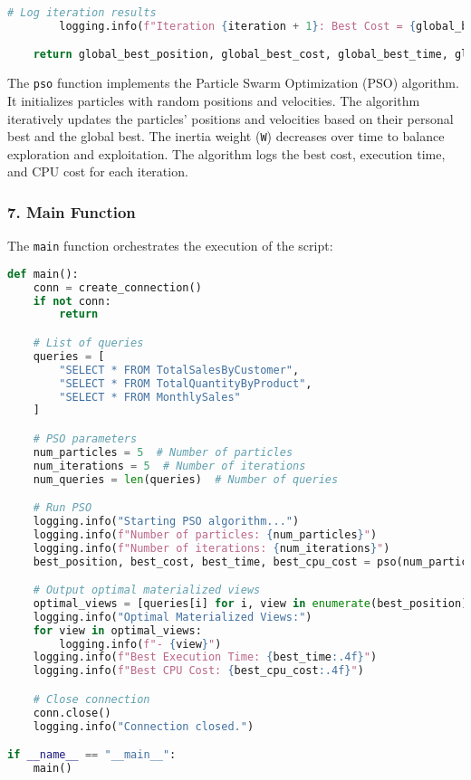 \begin{lstlisting}[language=Python]
        # Log iteration results
        logging.info(f"Iteration {iteration + 1}: Best Cost = {global_best_cost:.4f}, Execution Time = {global_best_time:.4f}, CPU Cost = {global_best_cpu_cost:.4f}")

    return global_best_position, global_best_cost, global_best_time, global_best_cpu_cost
\end{lstlisting}\vspace{.4cm}

The \texttt{pso} function implements the Particle Swarm Optimization (PSO) algorithm. It initializes particles with random positions and velocities. The algorithm iteratively updates the particles' positions and velocities based on their personal best and the global best. The inertia weight (\texttt{W}) decreases over time to balance exploration and exploitation. The algorithm logs the best cost, execution time, and CPU cost for each iteration.

\subsubsection*{7. Main Function}
The \texttt{main} function orchestrates the execution of the script:
\begin{lstlisting}[language=Python]
def main():
    conn = create_connection()
    if not conn:
        return

    # List of queries
    queries = [
        "SELECT * FROM TotalSalesByCustomer",  
        "SELECT * FROM TotalQuantityByProduct",  
        "SELECT * FROM MonthlySales"  
    ]

    # PSO parameters
    num_particles = 5  # Number of particles
    num_iterations = 5  # Number of iterations
    num_queries = len(queries)  # Number of queries

    # Run PSO
    logging.info("Starting PSO algorithm...")
    logging.info(f"Number of particles: {num_particles}")
    logging.info(f"Number of iterations: {num_iterations}")
    best_position, best_cost, best_time, best_cpu_cost = pso(num_particles, num_iterations, num_queries, queries, conn)

    # Output optimal materialized views
    optimal_views = [queries[i] for i, view in enumerate(best_position) if view == 1]
    logging.info("Optimal Materialized Views:")
    for view in optimal_views:
        logging.info(f"- {view}")
    logging.info(f"Best Execution Time: {best_time:.4f}")
    logging.info(f"Best CPU Cost: {best_cpu_cost:.4f}")

    # Close connection
    conn.close()
    logging.info("Connection closed.")

if __name__ == "__main__":
    main()
\end{lstlisting}\vspace{.4cm}

